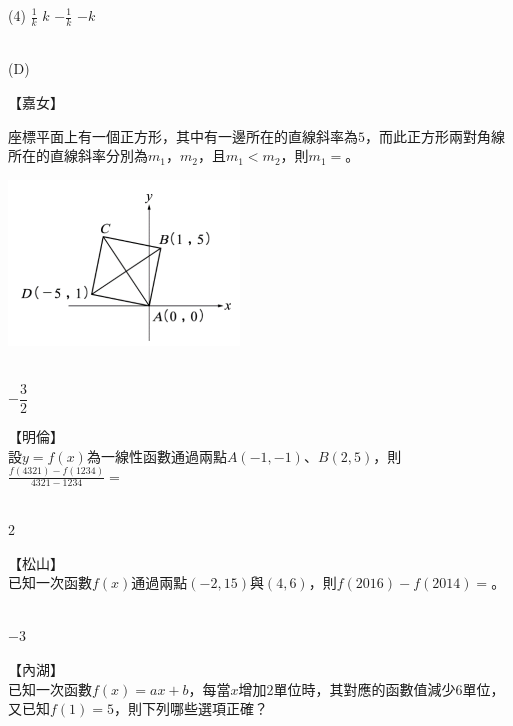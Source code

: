 \documentclass
[answers]
{exam}
\newcommand\ul[1]{\uline{\hspace*{#1}}}
\theoremstyle{definition}
\begin{document}
\begin{questions}
\begin{tasks}(4)
	\task $\frac{1}{k}$
	\task $k$
	\task $-\frac{1}{k}$
	\task $-k$
\end{tasks}

\begin{solution}~\\
	(D)
\end{solution}

\question
【嘉女】\\
\begin{minipage}[t]{0.7\linewidth}
	座標平面上有一個正方形，其中有一邊所在的直線斜率為$5$，而此正方形兩對角線所在的直線斜率分別為$m_1$，$m_2$，且$m_1 < m_2$，則$m_1=$\ul{50pt}。
\end{minipage}
\hfill
\begin{minipage}[t]{0.3\linewidth}
	\vspace*{-0.3cm}
	\includegraphics[scale=1]{./figure/9.png}
	\raggedleft %
\end{minipage}

\begin{solution}~\\
	$-\dfrac{3}{2}$
\end{solution}

\question
【明倫】\\
設$y = f(x)$為一線性函數通過兩點$A\left( -1,-1\right)$、$B\left( 2,5\right)$，則$\frac{f(4321)-f(1234)}{4321-1234} = $\ul{50pt}
\begin{solution}~\\
	$2$
\end{solution}


\question
【松山】\\
已知一次函數$f(x)$通過兩點$\left( -2,15\right)$與$\left( 4,6\right)$，則$f(2016)-f(2014)=$\ul{50pt}。
\begin{solution}~\\
	$-3$
\end{solution}

\question
【內湖】\\
已知一次函數$f(x)=ax+b$，每當$x$增加$2$單位時，其對應的函數值減少$6$單位，又已知$f(1)=5$，則下列哪些選項正確？


\end{questions}
\end{document}
